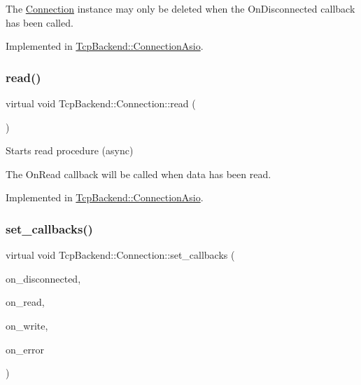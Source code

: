 The \hyperlink{classTcpBackend_1_1Connection}{Connection} instance may only be deleted when the On\+Disconnected callback has been called. 

Implemented in \hyperlink{classTcpBackend_1_1ConnectionAsio_a4601c22735a27b1a835bfa73d9842848}{Tcp\+Backend\+::\+Connection\+Asio}.

\mbox{\label{classTcpBackend_1_1Connection_a53c7544a1dc738fbf69d8081742f319c}} 
\subsubsection{\texorpdfstring{read()}{read()}}
{\footnotesize\ttfamily virtual void Tcp\+Backend\+::\+Connection\+::read (\begin{DoxyParamCaption}{ }\end{DoxyParamCaption})\hspace{0.3cm}{\ttfamily [pure virtual]}}



Starts read procedure (async) 

The On\+Read callback will be called when data has been read. 

Implemented in \hyperlink{classTcpBackend_1_1ConnectionAsio_a97faa75722fa9034ba03cf32512a6f22}{Tcp\+Backend\+::\+Connection\+Asio}.

\mbox{\label{classTcpBackend_1_1Connection_a653318aa6306df78e53af47ae9d05e04}} 
\subsubsection{\texorpdfstring{set\+\_\+callbacks()}{set\_callbacks()}}
{\footnotesize\ttfamily virtual void Tcp\+Backend\+::\+Connection\+::set\+\_\+callbacks (\begin{DoxyParamCaption}\item[{const \hyperlink{namespaceTcpBackend_a2ce9b1a1f46bfa6c4b1ad38c8aa262a6}{On\+Disconnected} \&}]{on\+\_\+disconnected,  }\item[{const \hyperlink{namespaceTcpBackend_a7d2c9f63e8017af705255d4ed08264a7}{On\+Read} \&}]{on\+\_\+read,  }\item[{const \hyperlink{namespaceTcpBackend_a670c71abc926680e1ea574a5f3a99135}{On\+Write} \&}]{on\+\_\+write,  }\item[{const \hyperlink{namespaceTcpBackend_a17e8f044749312a6692cd0135565cbc4}{On\+Error} \&}]{on\+\_\+error }\end{DoxyParamCaption})\hspace{0.3cm}{\ttfamily [pure virtual]}}



